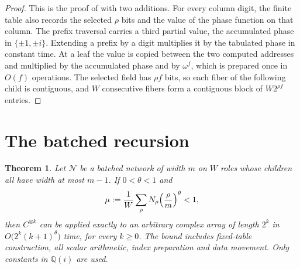 \documentclass[11pt]{article}
\newtheorem{theorem}{Theorem}[section]
\theoremstyle{definition}
\begin{document}
\begin{proof}
This is the proof of \cite[Lemma~2.5]{oai-dft} with two additions. For every
column digit, the finite table also records the selected $\rho$ bits and the
value of the phase function on that column. The prefix traversal carries a
third partial value, the accumulated phase in $\{\pm1,\pm i\}$. Extending a
prefix by a digit multiplies it by the tabulated phase in constant time. At a
leaf the value is copied between the two computed addresses and multiplied by
the accumulated phase and by $\omega^f$, which is prepared once in $O(f)$
operations. The selected field has $\rho f$ bits, so each
fiber of the following child is contiguous, and $W$ consecutive fibers form a
contiguous block of $W2^{\rho f}$ entries.
\end{proof}

\section{The batched recursion}
\begin{theorem}\label{thm:batched}
Let $\mathcal N$ be a batched network of width $m$ on $W$ roles whose children
all have width at most $m-1$. If $0<\theta<1$ and
\[
 \mu:=\frac1W\sum_{\rho}N_\rho\Bigl(\frac\rho m\Bigr)^{\theta}<1,
\]
then $C^{\otimes k}$ can be applied exactly to an arbitrary complex array of
length $2^k$ in $O\bigl(2^k(k+1)^\theta\bigr)$ time, for every $k\ge0$. The
bound includes fixed-table construction, all scalar arithmetic, index
preparation and data movement. Only constants in $\mathbb Q(i)$ are used.
\end{theorem}
\end{document}
